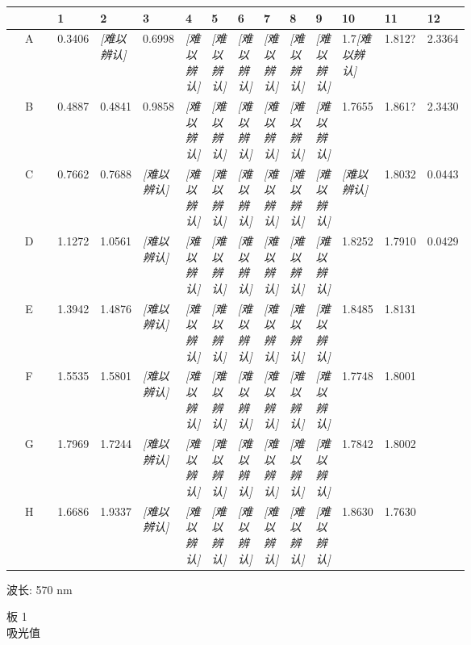 \documentclass[UTF8,10pt,a4paper,fontset=fandol]{ctexart}
\begin{document}
\begin{center}
\scriptsize
\setlength{\tabcolsep}{2pt}
\begin{tabular}{c|*{12}{p{0.055\linewidth}|}}
 & 1 & 2 & 3 & 4 & 5 & 6 & 7 & 8 & 9 & 10 & 11 & 12\\ \hline
A & 0.3406 & \textit{[难以辨认]} & 0.6998 & \textit{[难以辨认]} & \textit{[难以辨认]} & \textit{[难以辨认]} & \textit{[难以辨认]} & \textit{[难以辨认]} & \textit{[难以辨认]} & 1.7\textit{[难以辨认]} & 1.812? & 2.3364\\ \hline
B & 0.4887 & 0.4841 & 0.9858 & \textit{[难以辨认]} & \textit{[难以辨认]} & \textit{[难以辨认]} & \textit{[难以辨认]} & \textit{[难以辨认]} & \textit{[难以辨认]} & 1.7655 & 1.861? & 2.3430\\ \hline
C & 0.7662 & 0.7688 & \textit{[难以辨认]} & \textit{[难以辨认]} & \textit{[难以辨认]} & \textit{[难以辨认]} & \textit{[难以辨认]} & \textit{[难以辨认]} & \textit{[难以辨认]} & \textit{[难以辨认]} & 1.8032 & 0.0443\\ \hline
D & 1.1272 & 1.0561 & \textit{[难以辨认]} & \textit{[难以辨认]} & \textit{[难以辨认]} & \textit{[难以辨认]} & \textit{[难以辨认]} & \textit{[难以辨认]} & \textit{[难以辨认]} & 1.8252 & 1.7910 & 0.0429\\ \hline
E & 1.3942 & 1.4876 & \textit{[难以辨认]} & \textit{[难以辨认]} & \textit{[难以辨认]} & \textit{[难以辨认]} & \textit{[难以辨认]} & \textit{[难以辨认]} & \textit{[难以辨认]} & 1.8485 & 1.8131 & \\ \hline
F & 1.5535 & 1.5801 & \textit{[难以辨认]} & \textit{[难以辨认]} & \textit{[难以辨认]} & \textit{[难以辨认]} & \textit{[难以辨认]} & \textit{[难以辨认]} & \textit{[难以辨认]} & 1.7748 & 1.8001 & \\ \hline
G & 1.7969 & 1.7244 & \textit{[难以辨认]} & \textit{[难以辨认]} & \textit{[难以辨认]} & \textit{[难以辨认]} & \textit{[难以辨认]} & \textit{[难以辨认]} & \textit{[难以辨认]} & 1.7842 & 1.8002 & \\ \hline
H & 1.6686 & 1.9337 & \textit{[难以辨认]} & \textit{[难以辨认]} & \textit{[难以辨认]} & \textit{[难以辨认]} & \textit{[难以辨认]} & \textit{[难以辨认]} & \textit{[难以辨认]} & 1.8630 & 1.7630 & \\
\end{tabular}
\end{center}

\medskip
\noindent 波长: 570 nm

\medskip
\noindent 板 1\\
吸光值
\end{document}
